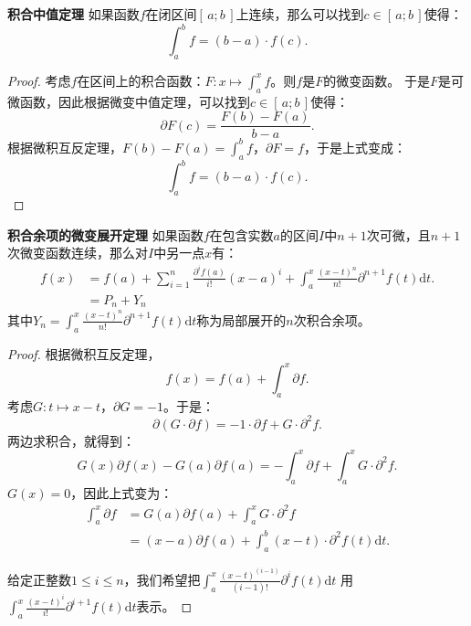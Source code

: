 \documentclass[12pt,UTF8]{ctexbook}
\begin{document}
\begin{appendix}
\begin{tm}{\textbf{积合中值定理}}
    如果函数$f$在闭区间$[\,a; b\,]$上连续，那么可以找到$c\in[\,a;b\,]$使得：
    $$ \int_a^b f = (b - a)\cdot f(c).$$
\end{tm}

\begin{proof}
    考虑$f$在区间上的积合函数：$F: x\mapsto \int_a^x f$。则$f$是$F$的微变函数。
    于是$F$是可微函数，因此根据微变中值定理，可以找到$c\in[\,a;b\,]$使得：
    $$ \partial F(c) = \frac{F(b) - F(a)}{b - a}.$$
    根据微积互反定理，$F(b) - F(a) = \int_a^b f$，$\partial F = f$，于是上式变成：
    $$ \int_a^b f = (b - a)\cdot f(c).$$
\end{proof}

\begin{tm}{\textbf{积合余项的微变展开定理}}
    如果函数$f$在包含实数$a$的区间$I$中$n+1$次可微，且$n+1$次微变函数连续，那么对$I$中另一点$x$有：
    \begin{align*}
        f(x) &= f(a) + \sum_{i=1}^n \frac{\partial^i f(a)}{i!} (x - a)^i + \int_a^x \frac{(x - t)^{n}}{n!} \partial^{n+1} f(t)\mathrm{d}t. \\
        &= P_n + Y_n 
    \end{align*}
    其中$Y_n = \int_a^x \frac{(x - t)^{n}}{n!} \partial^{n+1} f(t)\mathrm{d}t$称为局部展开的$n$次积合余项。
\end{tm}

\begin{proof}
    根据微积互反定理，
    $$ f(x) = f(a) + \int_a^x \partial f .$$
    考虑$G : t \mapsto x - t $，$\partial G = -1$。于是：
    $$ \partial (G\cdot \partial f) = -1 \cdot \partial f + G \cdot \partial^2 f. $$
    两边求积合，就得到：
    $$ G(x) \partial f(x) - G(a) \partial f(a) = - \int_a^x \partial f + \int_a^x G \cdot \partial^2 f. $$
    $G(x) = 0$，因此上式变为：
    \begin{align*}
        \int_a^x \partial f &=  G(a) \partial f(a) + \int_a^x G \cdot \partial^2 f \\
        &= (x - a) \partial f(a) + \int_a^b (x - t) \cdot \partial^2 f(t)\mathrm{d}t. 
    \end{align*}
    
    给定正整数$1\leqslant i \leqslant n$，我们希望把$\int_a^x \frac{(x - t)^{(i-1)}}{(i-1)!} \partial^{i} f(t)\mathrm{d}t$
    用$\int_a^x \frac{(x - t)^{i}}{i!} \partial^{i+1} f(t)\mathrm{d}t$表示。


\end{proof}
\end{appendix}
\end{document}
